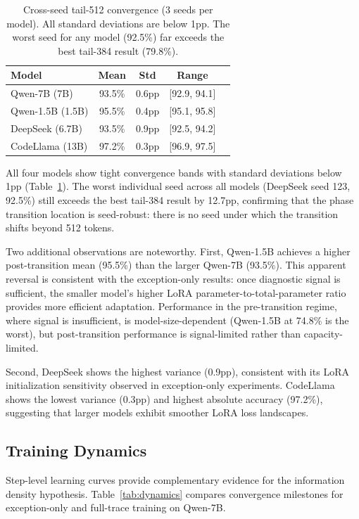 \documentclass[11pt,a4paper]{article}
\begin{document}
\begin{table}[t]
\centering
\small
\begin{tabular}{lcccc}
\toprule
\textbf{Model} & \textbf{Mean} & \textbf{Std} & \textbf{Range} \\
\midrule
Qwen-7B (7B) & 93.5\% & 0.6pp & [92.9, 94.1] \\
Qwen-1.5B (1.5B) & 95.5\% & 0.4pp & [95.1, 95.8] \\
DeepSeek (6.7B) & 93.5\% & 0.9pp & [92.5, 94.2] \\
CodeLlama (13B) & 97.2\% & 0.3pp & [96.9, 97.5] \\
\bottomrule
\end{tabular}
\caption{Cross-seed tail-512 convergence (3 seeds per model). All standard deviations are below 1pp. The worst seed for any model (92.5\%) far exceeds the best tail-384 result (79.8\%).}
\label{tab:cross_seed}
\end{table}

All four models show tight convergence bands with standard deviations below 1pp (Table~\ref{tab:cross_seed}). The worst individual seed across all models (DeepSeek seed 123, 92.5\%) still exceeds the best tail-384 result by 12.7pp, confirming that the phase transition location is seed-robust: there is no seed under which the transition shifts beyond 512 tokens.

Two additional observations are noteworthy. First, Qwen-1.5B achieves a higher post-transition mean (95.5\%) than the larger Qwen-7B (93.5\%). This apparent reversal is consistent with the exception-only results: once diagnostic signal is sufficient, the smaller model's higher LoRA parameter-to-total-parameter ratio provides more efficient adaptation. Performance in the pre-transition regime, where signal is insufficient, is model-size-dependent (Qwen-1.5B at 74.8\% is the worst), but post-transition performance is signal-limited rather than capacity-limited.

Second, DeepSeek shows the highest variance (0.9pp), consistent with its LoRA initialization sensitivity observed in exception-only experiments. CodeLlama shows the lowest variance (0.3pp) and highest absolute accuracy (97.2\%), suggesting that larger models exhibit smoother LoRA loss landscapes.

\subsection{Training Dynamics}

Step-level learning curves provide complementary evidence for the information density hypothesis. Table~\ref{tab:dynamics} compares convergence milestones for exception-only and full-trace training on Qwen-7B.
\end{document}
